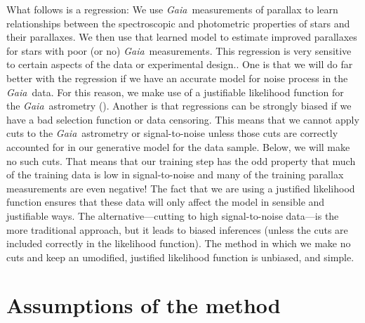 \documentclass[modern]{aastex62}
\newcommand{\project}[1]{\textsl{#1}}
\newcommand{\gaia}{\project{Gaia}}
\begin{document}
What follows is a regression:
We use \gaia\ measurements of parallax to learn relationships between 
the spectroscopic and photometric properties of stars and their parallaxes.
We then use that learned model to estimate improved parallaxes for stars with
poor (or no) \gaia\ measurements.
This regression is very sensitive to certain aspects of the data or experimental
design..
One is that we will do far better with the regression if we have an accurate
model for noise process in the \gaia\ data.
For this reason, we make use of a justifiable likelihood function for the
\gaia\ astrometry (\citealt{gaialf}).
Another is that regressions can be strongly biased if we have a bad selection function
or data censoring.
This means that we cannot apply cuts to the \gaia\ astrometry or signal-to-noise
unless those cuts are correctly accounted for in our generative model for the
data sample.
Below, we will make no such cuts. That means that our training step has the odd
property that much of the training data is low in signal-to-noise and many of the
training parallax measurements are even negative!
The fact that we are using a justified likelihood function ensures that these
data will only affect the model in sensible and justifiable ways.
The alternative---cutting to high signal-to-noise data---is the more traditional
approach, but it leads to biased inferences (unless the cuts are included correctly
in the likelihood function).
The method in which we make no cuts and keep an umodified, justified likelihood function
is unbiased, and simple.

\section{Assumptions of the method}\label{sec:assumptions}
\end{document}
